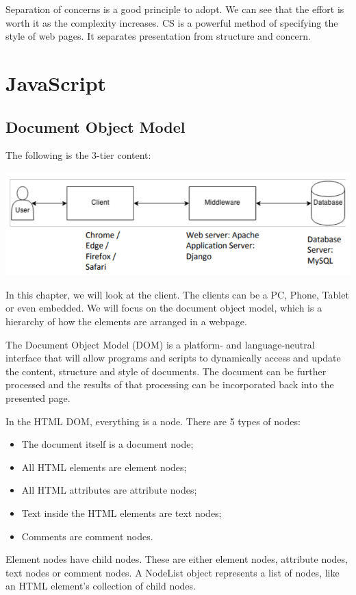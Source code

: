 \documentclass[a4paper, openany]{memoir}
\begin{document}
\noindent Separation of concerns is a good principle to adopt. We can see that the effort is worth it as the complexity increases. CS is a powerful method of specifying the style of web pages. It separates presentation from structure and concern.
\newpage

\section{JavaScript}
\subsection{Document Object Model}
The following is the 3-tier content:
\begin{center}
    \includegraphics[scale=0.7]{src/L12I1.PNG}
\end{center}
In this chapter, we will look at the client. The clients can be a PC, Phone, Tablet or even embedded. We will focus on the document object model, which is a hierarchy of how the elements are arranged in a webpage.

\noindent The Document Object Model (DOM) is a platform- and language-neutral interface that will allow programs and scripts to dynamically access and update the content, structure and style of documents. The document can be further processed and the results of that processing can be incorporated back into the presented page.

\noindent In the HTML DOM, everything is a node. There are 5 types of nodes:
\begin{itemize}
    \item The document itself is a document node;
    \item All HTML elements are element nodes;
    \item All HTML attributes are attribute nodes;
    \item Text inside the HTML elements are text nodes;
    \item Comments are comment nodes.
\end{itemize}
Element nodes have child nodes. These are either element nodes, attribute nodes, text nodes or comment nodes. A NodeList object represents a list of nodes, like an HTML element's collection of child nodes.
\end{document}
